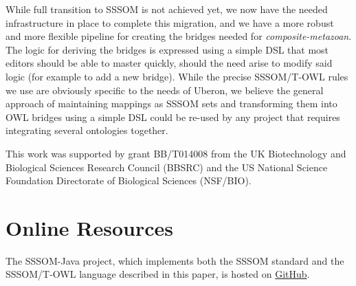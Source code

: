 \documentclass{ceurart}
\begin{document}
While full transition to SSSOM is not achieved yet, we now have the
needed infrastructure in place to complete this migration, and we have a
more robust and more flexible pipeline for creating the bridges needed
for \emph{composite-metazoan}. The logic for deriving the bridges is
expressed using a simple DSL that most editors should be able to master
quickly, should the need arise to modify said logic (for example to add
a new bridge). While the precise SSSOM/T-OWL rules we use are obviously
specific to the needs of Uberon, we believe the general approach of
maintaining mappings as SSSOM sets and transforming them into OWL
bridges using a simple DSL could be re-used by any project that requires
integrating several ontologies together.

\begin{acknowledgments}
This work was supported by grant BB/T014008 from the UK Biotechnology
and Biological Sciences Research Council (BBSRC) and the US National
Science Foundation Directorate of Biological Sciences (NSF/BIO).
\end{acknowledgments}



\appendix

\section{Online Resources}

The SSSOM-Java project, which implements both the SSSOM standard and the
SSSOM/T-OWL language described in this paper, is hosted on
\href{https://github.com/gouttegd/sssom-java/}{GitHub}.
\end{document}
